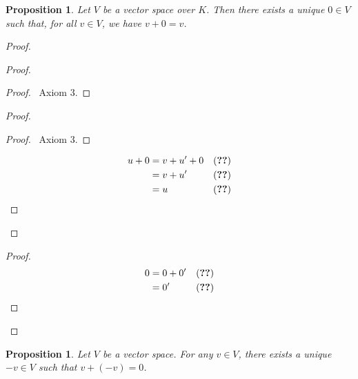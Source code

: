 \documentclass{book}
\let\qed\relax
\newtheorem{prop}[ax]{Proposition}
\theoremstyle{definition}
\begin{document}
\begin{prop}
\label{prop:zero}
Let $V$ be a vector space over $K$. Then there exists a unique $0 \in V$ such that, for all $v \in V$, we have $v + 0 = v$.
\end{prop}

\begin{proof}
\pf
{}
\begin{proof}
	\begin{proof}
		\pf\ Axiom 3.
	\end{proof}
	\begin{proof}
		\begin{proof}
			\pf\ Axiom 3.
		\end{proof}
		\begin{align*}
			u + 0 & = v + u' + 0 & (\text{\stepref{ii}}) \\
			& = v + u' & (\text{\stepref{b}}) \\
			& = u & (\text{\stepref{ii}}) 
		\end{align*}
	\end{proof}
\end{proof}
\begin{proof}
	\begin{align*}
		0 & = 0 + 0' & (\text{\stepref{b}}) \\
		& = 0' & (\text{\stepref{c}})
	\end{align*}
\end{proof}
\qed
\end{proof}

\begin{prop}
\label{prop:subtract}
Let $V$ be a vector space. For any $v \in V$, there exists a unique $-v \in V$ such that $v + (-v) = 0$.
\end{prop}
\end{document}
